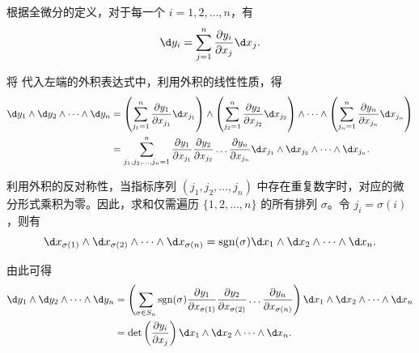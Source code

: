 \begin{myproof}
    根据全微分的定义，对于每一个 $i = 1, 2, \dots, n$，有
    \begin{equation}
        \d y_i = \sum_{j=1}^n \frac{\partial y_i}{\partial x_j} \d x_j. \label{eq:diff-definition-1}
    \end{equation}

    将  代入左端的外积表达式中，利用外积的线性性质，得
    \begin{equation}
        \begin{aligned}
            \d y_1 \wedge \d y_2 \wedge \dots \wedge \d y_n & = \left( \sum_{j_1=1}^n \frac{\partial y_1}{\partial x_{j_1}} \d x_{j_1} \right) \wedge \left( \sum_{j_2=1}^n \frac{\partial y_2}{\partial x_{j_2}} \d x_{j_2} \right) \wedge \dots \wedge \left( \sum_{j_n=1}^n \frac{\partial y_n}{\partial x_{j_n}} \d x_{j_n} \right) \\
                                                            & = \sum_{j_1, j_2, \dots, j_n = 1}^n \frac{\partial y_1}{\partial x_{j_1}} \frac{\partial y_2}{\partial x_{j_2}} \dots \frac{\partial y_n}{\partial x_{j_n}} \d x_{j_1} \wedge \d x_{j_2} \wedge \dots \wedge \d x_{j_n}.
        \end{aligned}
    \end{equation}

    利用外积的反对称性，当指标序列 $(j_1, j_2, \dots, j_n)$ 中存在重复数字时，对应的微分形式乘积为零。因此，求和仅需遍历 $\{1, 2, \dots, n\}$ 的所有排列 $\sigma$。令 $j_i = \sigma(i)$，则有
    \begin{equation}
        \d x_{\sigma(1)} \wedge \d x_{\sigma(2)} \wedge \dots \wedge \d x_{\sigma(n)} = \operatorname{sgn}(\sigma) \d x_1 \wedge \d x_2 \wedge \dots \wedge \d x_n.
    \end{equation}

    由此可得
    \begin{equation}
        \begin{aligned}
            \d y_1 \wedge \d y_2 \wedge \dots \wedge \d y_n & = \left( \sum_{\sigma \in S_n} \operatorname{sgn}(\sigma) \frac{\partial y_1}{\partial x_{\sigma(1)}} \frac{\partial y_2}{\partial x_{\sigma(2)}} \dots \frac{\partial y_n}{\partial x_{\sigma(n)}} \right) \d x_1 \wedge \d x_2 \wedge \dots \wedge \d x_n \\
                                                            & = \det \left( \frac{\partial y_i}{\partial x_j} \right) \d x_1 \wedge \d x_2 \wedge \dots \wedge \d x_n.
        \end{aligned}
    \end{equation}


\end{myproof}
